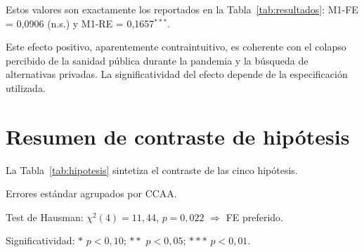 Estos valores son exactamente los reportados en la Tabla~\ref{tab:resultados}:
M1-FE = 0{,}0906 (n.s.) y M1-RE = 0{,}1657$^{***}$.

Este efecto positivo, aparentemente contraintuitivo, es coherente con el
colapso percibido de la sanidad pública durante la pandemia y la búsqueda de
alternativas privadas. La significatividad del efecto depende de la
especificación utilizada.

\section{Resumen de contraste de hipótesis}
\label{sec:resumen_hipotesis}

La Tabla~\ref{tab:hipotesis} sintetiza el contraste de las cinco hipótesis.

\begin{table}[htbp]
  \centering
  \caption{Síntesis del contraste de hipótesis}
  \label{tab:hipotesis}
  \begin{threeparttable}
    \small
    \begin{tablenotes}[flushleft]
      \footnotesize
      \item Errores estándar agrupados por CCAA.
      \item Test de Hausman: $\chi^2(4)=11{,}44$, $p=0{,}022$ $\Rightarrow$ FE preferido.
      \item Significatividad: $*$ $p < 0{,}10$; $**$ $p < 0{,}05$; $***$ $p < 0{,}01$.
    \end{tablenotes}
  \end{threeparttable}
\end{table}
